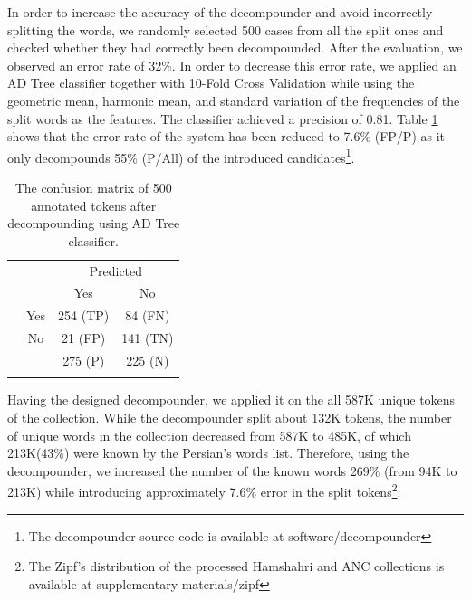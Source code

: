 In order to increase the accuracy of the decompounder and avoid incorrectly splitting the words, we randomly selected 500 cases from all the split ones and checked whether they had correctly been decompounded. 
After the evaluation, we observed an error rate of 32\%. In order to decrease this error rate, %
we applied an AD Tree classifier together with 10-Fold Cross Validation while using the geometric mean, harmonic mean, and standard variation of the frequencies of the split words as the features. The classifier achieved a precision of 0.81. Table \ref{table:confusionmatrix} shows that the error rate of the system has been reduced to 7.6\% (FP/P) as it only decompounds 55\% (P/All) of the introduced candidates\footnote{The decompounder source code is available at software/decompounder}.

\begin{table}[t!]
\begin{center}
\caption{The confusion matrix of 500 annotated tokens after decompounding using AD Tree classifier. } 
\vspace{-0.2cm}
\begin{tabular}{c c c c }
\hline
 & & \multicolumn{2}{c}{Predicted} \\
 & & Yes & No \\
\hline
\parbox[t]{2mm}{} & Yes & 254 (TP) & 84 (FN) \\[1ex]
 & No & 21 (FP) & 141 (TN)\\[1ex]
\hline
 &  & 275 (P) & 225 (N)\\
\label{table:confusionmatrix} 
\end{tabular}
\end{center}
\vspace{-1.3cm}
\end{table}

Having the designed decompounder, we applied it on the all 587K unique tokens of the collection. While the decompounder split about 132K tokens, the number of unique words in the collection decreased from 587K to 485K, of which 213K(43\%) were known by the Persian's words list. Therefore, using the decompounder, we increased the number of the known words  269\% (from 94K to 213K) while introducing approximately 7.6\% error in the split tokens\footnote{The Zipf's distribution of the processed Hamshahri and ANC collections is available at supplementary-materials/zipf}.

